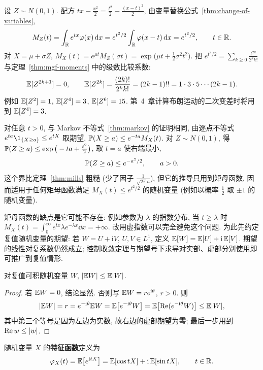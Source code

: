 \begin{example}[正态分布的矩母函数与矩]\label{ex:normal-mgf}
设 $Z\sim N(0,1)$. 配方 $tx-\frac{x^2}{2}=\frac{t^2}{2}-\frac{(x-t)^2}{2}$, 由变量替换公式~\ref{thm:change-of-variables},
\[
M_Z(t)=\int_{\R}e^{tx}\varphi(x)\dd x=e^{t^2/2}\int_{\R}\varphi(x-t)\dd x=e^{t^2/2},\qquad t\in\R.
\]
对 $X=\mu+\sigma Z$, $M_X(t)=e^{\mu t}M_Z(\sigma t)=\exp\big(\mu t+\frac{1}{2}\sigma^2t^2\big)$. 把 $e^{t^2/2}=\sum_{k\ge0}\frac{t^{2k}}{2^kk!}$ 与定理~\ref{thm:mgf-moments} 中的级数比较系数:
\[
\E[Z^{2k+1}]=0,\qquad \E[Z^{2k}]=\frac{(2k)!}{2^kk!}=(2k-1)!!=1\cdot3\cdot5\cdots(2k-1).
\]
例如 $\E[Z^2]=1$, $\E[Z^4]=3$, $\E[Z^6]=15$. 第~4~章计算布朗运动的二次变差时将用到 $\E[Z^4]=3$.
\end{example}

\begin{example}[Chernoff 界]\label{ex:chernoff}
对任意 $t>0$, 与 Markov 不等式~\ref{thm:markov} 的证明相同, 由逐点不等式 $e^{ta}\1_{\{X\ge a\}}\le e^{tX}$ 取期望,
$\P(X\ge a)\le e^{-ta}M_X(t)$. 对 $Z\sim N(0,1)$, 得 $\P(Z\ge a)\le\exp\big(-ta+\frac{t^2}{2}\big)$, 取 $t=a$ 使右端最小,
\[
\P(Z\ge a)\le e^{-a^2/2},\qquad a>0.
\]
这个界比定理~\ref{thm:mills} 粗糙 (少了因子 $\frac{1}{\sqrt{2\pi}a}$), 但它的推导只用到矩母函数, 因而适用于任何矩母函数满足 $M_X(t)\le e^{t^2/2}$ 的随机变量 (例如以概率 $\frac{1}{2}$ 取 $\pm1$ 的随机变量).
\end{example}

矩母函数的缺点是它可能不存在: 例如参数为 $\lambda$ 的指数分布, 当 $t\ge\lambda$ 时 $M_X(t)=\int_0^\infty e^{tx}\lambda e^{-\lambda x}\dd x=+\infty$. 改用虚指数可以完全避免这个问题. 为此先约定复值随机变量的期望: 若 $W=U+\mathrm{i}V$, $U,V\in L^1$, 定义 $\E[W]=\E[U]+\mathrm{i}\,\E[V]$. 期望的线性对复系数仍然成立; 控制收敛定理与期望号下求导对实部、虚部分别使用即可推广到复值情形.

\begin{lemma}\label{lem:complex-abs}
对复值可积随机变量 $W$, $\abs{\E W}\le\E\abs{W}$.
\end{lemma}

\begin{proof}
若 $\E W=0$, 结论显然. 否则写 $\E W=re^{\mathrm{i}\theta}$, $r>0$. 则
\[
\abs{\E W}=r=e^{-\mathrm{i}\theta}\E W=\E\big[e^{-\mathrm{i}\theta}W\big]=\E\big[\mathrm{Re}(e^{-\mathrm{i}\theta}W)\big]\le\E\abs{W},
\]
其中第三个等号是因为左边为实数, 故右边的虚部期望为零; 最后一步用到 $\mathrm{Re}\,w\le\abs{w}$.
\end{proof}

\begin{definition}[特征函数]\label{def:cf}
随机变量 $X$ 的\textbf{特征函数}定义为
\[
\varphi_X(t)=\E\big[e^{\mathrm{i}tX}\big]=\E[\cos tX]+\mathrm{i}\,\E[\sin tX],\qquad t\in\R.
\]
\end{definition}

